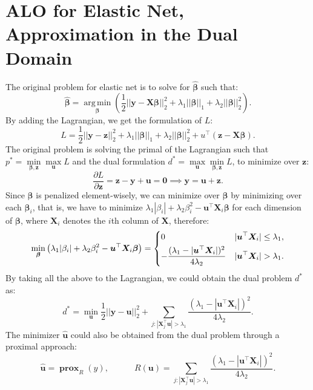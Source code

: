 \documentclass[11pt]{article}
\newcommand{\bu}{\bm{u}}
\newcommand{\by}{\bm{y}}
\newcommand{\bz}{\bm{z}}
\newcommand{\bX}{\bm{X}}
\newcommand{\bbeta}{\bm{\beta}}
\DeclareMathOperator{\bprox}{\mathbf{prox}}
\DeclareMathOperator*{\argmin}{arg\,min}
\begin{document}
\section{ALO for Elastic Net, Approximation in the Dual Domain}
The original problem for elastic net is to solve for $\hat{\bbeta}$ such that: \[\hat{\bbeta}=\argmin\limits_{\bbeta}\left(\frac{1}{2}||\by-\bX\bbeta||_{2}^{2} + \lambda_{1}||\bbeta||_{1}+\lambda_{2}||\bbeta||_{2}^{2}\right).\] By adding the Lagrangian, we get the formulation of $L$: \[L = \frac{1}{2}||\by-\bz||_{2}^{2} + \lambda_{1}||\bbeta||_{1}+\lambda_{2}||\bbeta||_{2}^{2}+u^{\top}(\bz-\bX\bbeta).\] The original problem is solving the primal of the Lagrangian such that $p^{*} = \min\limits_{\bbeta,\bz}\max\limits_{\bu}L$ and the dual formulation $d^{*} = \max\limits_{\bu}\min\limits_{\bbeta,\bz}L$, to minimize over $\bz$: \[\frac{\partial L}{\partial \bz} = \bz -\by +\bu = \bm{0}\implies \by = \bu + \bz.\] Since $\bbeta$ is penalized element-wisely, we can minimize over $\bbeta$ by minimizing over each $\bbeta_{i}$, that is, we have to minimize $\lambda_{1}|\beta_{i}| + \lambda_{2}\beta_{i}^{2} - \bu^{\top}\bX_{i}\bbeta$ for each dimension of $\bbeta$, where $\bX_{i}$ denotes the $i$th column of $\bX$, therefore: \[\min\limits_{\bbeta}\left(\lambda_{1}|\beta_{i}| + \lambda_{2}\beta_{i}^{2} - \bu^{\top}\bX_{i}\bbeta\right)=\begin{dcases}
0 & |\bu^{\top}\bX_{i}| \leq \lambda_{1},\\
-\frac{(\lambda_{1}-|\bu^{\top}\bX_{i}|)^{2}}{4\lambda_{2}} & |\bu^{\top}\bX_{i}| > \lambda_{1}.
\end{dcases}\] By taking all the above to the Lagrangian, we could obtain the dual problem $d^{*}$ as: \[d^{*} = \min\limits_{\bu}\frac{1}{2}||\by-\bu||_{2}^{2} + \sum_{j: |\bX_{j}^{\top}\bu| > \lambda_{1}}\frac{(\lambda_{1}-|\bu^{\top}\bX_{i}|)^{2}}{4\lambda_{2}}.\] The minimizer $\hat{\bu}$ could also be obtained from the dual problem through a proximal approach: \[\hat{\bu} = \bprox_{R}(y),\qquad\quad R(\bu) = \sum_{j:|\bX_{j}^{\top}\bu| > \lambda_{1}}\frac{(\lambda_{1}-|\bu^{\top}\bX_{i}|)^{2}}{4\lambda_{2}}.\]
\end{document}
